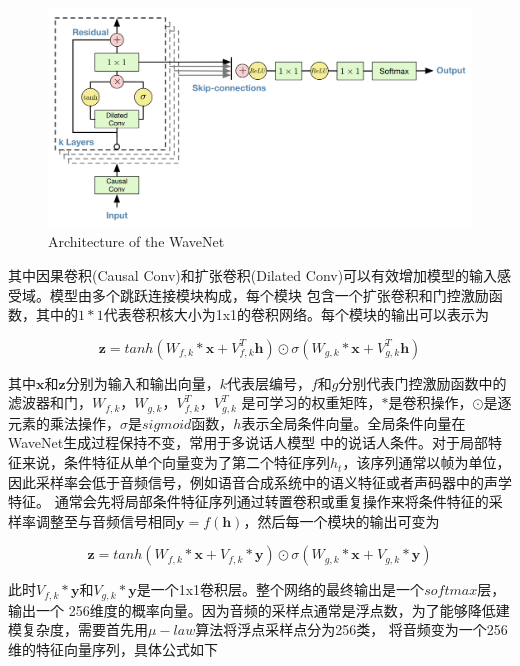 \begin{figure}[!htp]
    \centering
    \includegraphics[width=12cm,trim=0 0 0 0,clip]{figure/4_wavenet.png}
    {Architecture of the WaveNet}
    \label{fig:wavenetarch}
\end{figure}

其中因果卷积(Causal Conv)和扩张卷积(Dilated Conv)可以有效增加模型的输入感受域。模型由多个跳跃连接模块构成，每个模块
包含一个扩张卷积和门控激励函数，其中的$1*1$代表卷积核大小为1x1的卷积网络。每个模块的输出可以表示为

\begin{equation}
    \mathbf{z} = tanh(W_{f,k} * \mathbf{x} + V^{T}_{f,k}\mathbf{h})\odot \sigma(W_{g,k} * \mathbf{x} + V^{T}_{g,k}\mathbf{h})
\end{equation}

其中$\mathbf{x}$和$\mathbf{z}$分别为输入和输出向量，$k$代表层编号，$f$和$g$分别代表门控激励函数中的滤波器和门，$W_{f,k}$，$W_{g,k}$，$V^T_{f,k}$，$V^T_{g,k}$
是可学习的权重矩阵，$*$是卷积操作，$\odot$是逐元素的乘法操作，$\sigma$是$sigmoid$函数，$h$表示全局条件向量。全局条件向量在WaveNet生成过程保持不变，常用于多说话人模型
中的说话人条件。对于局部特征来说，条件特征从单个向量变为了第二个特征序列$h_t$，该序列通常以帧为单位，因此采样率会低于音频信号，例如语音合成系统中的语义特征或者声码器中的声学特征。
通常会先将局部条件特征序列通过转置卷积或重复操作来将条件特征的采样率调整至与音频信号相同$\mathbf{y} = f(\mathbf{h})$，然后每一个模块的输出可变为

\begin{equation}
    \mathbf{z} = tanh(W_{f,k} * \mathbf{x} + V_{f,k} * \mathbf{y}) \odot \sigma (W_{g,k} * \mathbf{x} + V_{g,k} * \mathbf{y})
\end{equation}

此时$V_{f,k} * \mathbf{y}$和$V_{g,k} * \mathbf{y}$是一个1x1卷积层。整个网络的最终输出是一个$softmax$层，输出一个
256维度的概率向量。因为音频的采样点通常是浮点数，为了能够降低建模复杂度，需要首先用$\mu-law$算法将浮点采样点分为256类，
将音频变为一个256维的特征向量序列，具体公式如下

